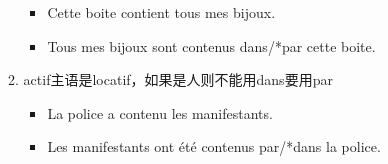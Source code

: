 \documentclass[UTF8]{report}
\begin{document}
\begin{enumerate}
\begin{enumerate}
        \begin{itemize}
            \item Cette boite contient tous mes bijoux.
            \item  Tous mes bijoux sont contenus dans/*par cette boite.
        \end{itemize}
        \item actif主语是locatif，如果是人则不能用dans要用par
        \begin{itemize}
            \item La police a contenu les manifestants.
            \item Les manifestants ont été contenus par/*dans la police.
        \end{itemize}
    \end{enumerate}
\end{enumerate}
\end{document}
